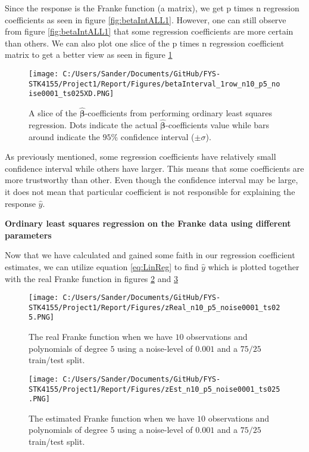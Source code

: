 \documentclass[12pt,a4paper]{article}
\begin{document}
\noindent Since the response is the Franke function (a matrix), we get p times n regression coefficients as seen in figure \ref{fig:betaIntALL1}. However, one can still observe from figure \ref{fig:betaIntALL1} that some regression coefficients are more certain than others. We can also plot one slice of the p times n regression coefficient matrix to get a better view as seen in figure \ref{fig:betaIntROW1}

\begin{figure}[H]
\centering
\texttt{[image: C:/Users/Sander/Documents/GitHub/FYS-STK4155/Project1/Report/Figures/betaInterval\_1row\_n10\_p5\_noise0001\_ts025XD.PNG]}
\caption{\label{fig:betaIntROW1} A slice of the $\hat{\boldsymbol{\beta}}$-coefficients from performing ordinary least squares regression. Dots indicate the actual $\hat{\boldsymbol{\beta}}$-coefficients value while bars around indicate the $95\%$ confidence interval ($\pm \sigma$).}
\end{figure}

\noindent As previously mentioned, some regression coefficients have relatively small confidence interval while others have larger. This means that some coefficients are more trustworthy than other. Even though the confidence interval may be large, it does not mean that particular coefficient is not responsible for explaining the response $\hat{y}$.

\begin{center}
\large{\textbf{Ordinary least squares regression on the Franke data using different parameters}}
\end{center}

\noindent Now that we have calculated and gained some faith in our regression coefficient estimates, we can utilize equation \ref{eq:LinReg} to find $\hat{y}$ which is plotted together with the real Franke function in figures \ref{fig:FrankeReal1} and \ref{fig:FrankeEst1}

\begin{figure}[H]
\centering
\texttt{[image: C:/Users/Sander/Documents/GitHub/FYS-STK4155/Project1/Report/Figures/zReal\_n10\_p5\_noise0001\_ts025.PNG]}
\caption{\label{fig:FrankeReal1} The real Franke function when we have $10$ observations and polynomials of degree $5$ using a noise-level of $0.001$ and a $75/25$ train/test split.}
\end{figure}

\begin{figure}[H]
\centering
\texttt{[image: C:/Users/Sander/Documents/GitHub/FYS-STK4155/Project1/Report/Figures/zEst\_n10\_p5\_noise0001\_ts025.PNG]}
\caption{\label{fig:FrankeEst1} The estimated Franke function when we have $10$ observations and polynomials of degree $5$ using a noise-level of $0.001$ and a $75/25$ train/test split.}
\end{figure}
\end{document}

